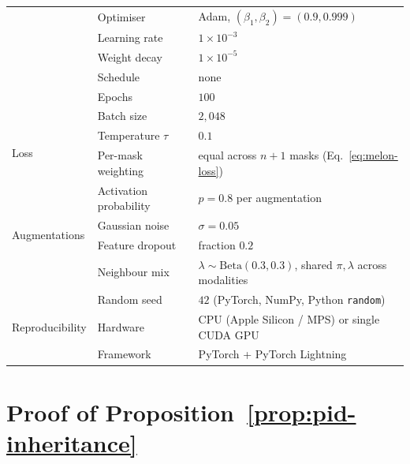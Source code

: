 \documentclass{article}
\theoremstyle{plain}
\theoremstyle{definition}
\begin{document}
\begin{table}[!htbp]
\begin{tabular}{lll}
  & Optimiser                 & Adam, $(\beta_1,\beta_2)=(0.9,0.999)$ \\
  & Learning rate             & $1\!\times\!10^{-3}$ \\
  & Weight decay              & $1\!\times\!10^{-5}$ \\
  & Schedule                  & none \\
  & Epochs                    & $100$ \\
  & Batch size                & $2{,}048$ \\
\midrule
\multirow{2}{*}{Loss}
  & Temperature $\tau$        & $0.1$ \\
  & Per-mask weighting        & equal across $n{+}1$ masks (Eq.~\ref{eq:melon-loss}) \\
\midrule
\multirow{4}{*}{Augmentations}
  & Activation probability    & $p=0.8$ per augmentation \\
  & Gaussian noise            & $\sigma=0.05$ \\
  & Feature dropout           & fraction $0.2$ \\
  & Neighbour mix             & $\lambda\sim\mathrm{Beta}(0.3,0.3)$, shared $\pi,\lambda$ across modalities \\
\midrule
\multirow{3}{*}{Reproducibility}
  & Random seed               & $42$ (PyTorch, NumPy, Python \texttt{random}) \\
  & Hardware                  & CPU (Apple Silicon / MPS) or single CUDA GPU \\
  & Framework                 & PyTorch + PyTorch Lightning \\
\bottomrule
\end{tabular}
\end{table}

\FloatBarrier
\section{Proof of Proposition~\ref{prop:pid-inheritance}}\label{app:proof}
\end{document}
